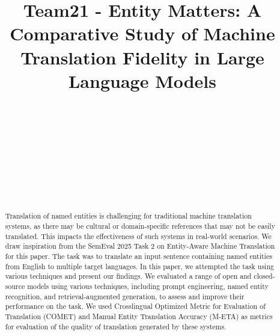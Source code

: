 \documentclass[final]{ecai}
\begin{document}
\begin{frontmatter}

\title{Team21 - Entity Matters: A Comparative Study of Machine Translation Fidelity in Large Language Models}

\author{~}
\author{}
\author{~}
\author{~}
\author{~}
\author{~}


\begin{abstract}
Translation of named entities is challenging for traditional machine translation systems, as there may be cultural 
or domain-specific references that may not be easily translated. 
This impacts the effectiveness of such systems in real-world scenarios. 
We draw inspiration from the SemEval 2025 Task 2 on Entity-Aware Machine Translation for this paper. 
The task was to translate an input sentence containing named entities from English to multiple target languages. 
In this paper, we attempted the task using various techniques and present our findings. 
We evaluated a range of open and closed-source models using various techniques, including prompt engineering, named entity recognition, and retrieval-augmented generation, 
to assess and improve their performance on the task.
We used Crosslingual Optimized Metric for Evaluation of Translation (COMET)\cite{rei-etal-2020-comet}
and Manual Entity Translation Accuracy (M-ETA) as metrics for evaluation of the quality of translation generated by these systems.
\end{abstract}
\end{frontmatter}


\end{document}
